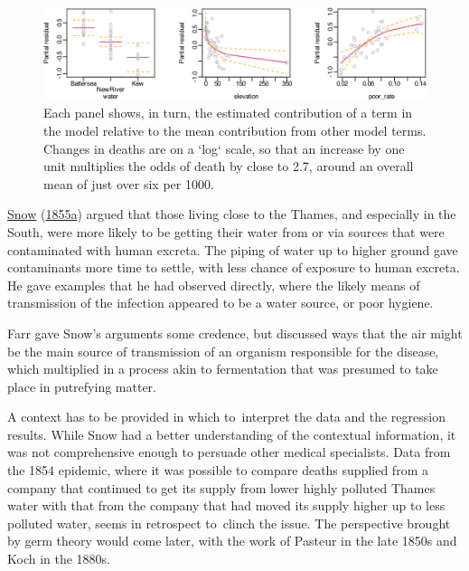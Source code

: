 \documentclass[
  10pt,
  b5paper]{book}
\begin{document}
\begin{figure}

{\centering \includegraphics[width=1\linewidth]{08-observational_files/figure-latex/Farr-1} 

}

\caption{Each panel shows, in turn, the estimated contribution
of a term in the model relative to the mean contribution from other model terms. Changes in deaths are on a `log` scale, so 
that an increase by one unit multiplies the odds of death by 
close to 2.7, around an overall mean of just over six per 1000.
}\label{fig:Farr}
\end{figure}

\protect\hyperlink{ref-snow1849mode}{Snow} (\protect\hyperlink{ref-snow1849mode}{1855a}) argued that those living
close to the Thames, and especially in the South, were
more likely to be getting their water from or via sources
that were contaminated with human excreta. The
piping of water up to higher ground gave contaminants
more time to settle, with less chance of exposure to human
excreta. He gave examples that he had observed directly,
where the likely means of transmission of the infection
appeared to be a water source, or poor hygiene.

Farr gave Snow's arguments some credence, but discussed
ways that the air might be the main source of transmission
of an organism responsible for the disease, which multiplied
in a process akin to fermentation that was presumed to take
place in putrefying matter.

A context has to be provided in which to~interpret the data
and the regression results. While Snow had a better understanding
of the contextual information, it was not comprehensive
enough to persuade other medical specialists. Data from the
1854 epidemic, where it was possible to compare deaths supplied
from a company that continued to get its supply from lower
highly polluted Thames water with that from the company that
had moved its supply higher up to less polluted water, seems
in retrospect to~clinch the issue. The perspective brought by
germ theory would come later, with the work of Pasteur in the
late 1850s and Koch in the 1880s.
\end{document}
